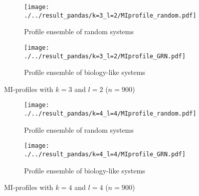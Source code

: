 \documentclass[../main.tex]{subfiles}
\begin{document}
\begin{figure}[H]
    \centering
    \begin{subfigure}[b]{0.4\textwidth}
        \texttt{[image: ./../result\_pandas/k=3\_l=2/MIprofile\_random.pdf]}
        \caption{Profile ensemble of random systems}
    \end{subfigure}
    \begin{subfigure}[b]{0.4\textwidth}
        \texttt{[image: ./../result\_pandas/k=3\_l=2/MIprofile\_GRN.pdf]}
        \caption{Profile ensemble of biology-like systems}
    \end{subfigure}
    \caption{MI-profiles with $k=3$ and $l=2$ ($n=900$)}
    \label{fig:profilel2}
\end{figure}

\begin{figure}[H]
    \centering
    \begin{subfigure}[b]{0.4\textwidth}
        \texttt{[image: ./../result\_pandas/k=4\_l=4/MIprofile\_random.pdf]}
        \caption{Profile ensemble of random systems}
    \end{subfigure}
    \begin{subfigure}[b]{0.4\textwidth}
        \texttt{[image: ./../result\_pandas/k=4\_l=4/MIprofile\_GRN.pdf]}
        \caption{Profile ensemble of biology-like systems}
    \end{subfigure}
    \caption{MI-profiles with $k=4$ and $l=4$ ($n=900$)}
    \label{fig:profilel4}
\end{figure}
\end{document}
